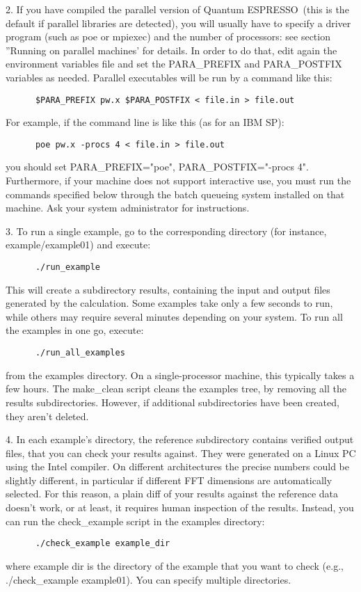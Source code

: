 \documentclass[12pt,a4paper]{article}
\def\qe{{\sc Quantum ESPRESSO}}
\begin{document}
2. If you have compiled the parallel version of \qe\ (this
is the default if parallel libraries are detected), you will usually
have to specify a driver program (such as poe or mpiexec) and the
number of processors: see section ''Running on parallel machines' for
details. In order to do that, edit again the environment variables file
and set the PARA\_PREFIX and PARA\_POSTFIX variables as needed. Parallel
executables will be run by a command like this: 
\begin{verbatim}
      $PARA_PREFIX pw.x $PARA_POSTFIX < file.in > file.out
\end{verbatim}
For example, if the command line is like this (as for an IBM SP):
\begin{verbatim}
      poe pw.x -procs 4 < file.in > file.out
\end{verbatim}
you should set PARA\_PREFIX="poe", PARA\_POSTFIX="-procs
4". Furthermore, if your machine does not support interactive use, you
must run the commands specified below through the batch queueing
system installed on that machine. Ask your system administrator for
instructions. 

3. To run a single example, go to the corresponding directory (for
   instance, example/example01) and execute: 
\begin{verbatim}
      ./run_example
\end{verbatim}
This will create a subdirectory results, containing the input and
output files generated by the calculation. Some examples take only a
few seconds to run, while others may require several minutes depending
on your system. To run all the examples in one go, execute:
\begin{verbatim}
      ./run_all_examples
\end{verbatim}
from the examples directory. On a single-processor machine, this
typically takes a few hours. The make\_clean script cleans the
examples tree, by removing all the results subdirectories. However, if
additional subdirectories have been created, they aren't deleted. 

4. In each example's directory, the reference subdirectory contains
verified output files, that you can check your results against. They
were generated on a Linux PC using the Intel compiler. On different
architectures the precise numbers could be slightly different, in
particular if different FFT dimensions are automatically selected. For
this reason, a plain diff of your results against the reference data
doesn't work, or at least, it requires human inspection of the
results. Instead, you can run the  
check\_example script in the examples directory:
\begin{verbatim}
      ./check_example example_dir
\end{verbatim}
where example dir is the directory of the example that you want to
check (e.g., ./check\_example example01). You can specify multiple
directories.  
\end{document}
